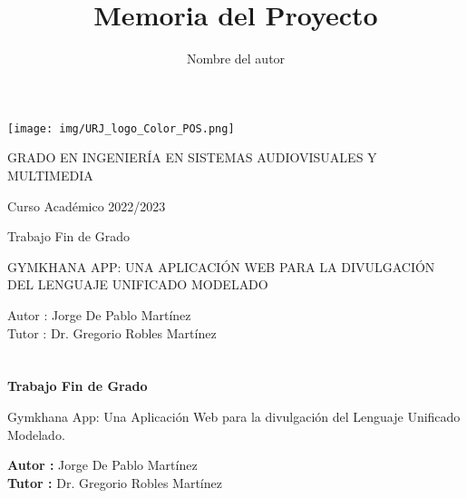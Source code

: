 \documentclass[a4paper, 12pt]{book}
\title{Memoria del Proyecto}
\author{Nombre del autor}
\begin{document}
\renewcommand{\refname}{Bibliografía}  %
\renewcommand{\appendixname}{Apéndice}


\begin{titlepage}
\begin{center}
\texttt{[image: img/URJ\_logo\_Color\_POS.png]}

\vspace{1.75cm}

\Large
GRADO EN INGENIERÍA EN SISTEMAS AUDIOVISUALES Y MULTIMEDIA

\vspace{0.4cm}

\large
Curso Académico 2022/2023

\vspace{0.8cm}

Trabajo Fin de Grado

\vspace{2.5cm}

\LARGE
GYMKHANA APP: UNA APLICACIÓN WEB PARA LA DIVULGACIÓN DEL LENGUAJE UNIFICADO MODELADO

\vspace{4cm}

\large
Autor : Jorge De Pablo Martínez \\
Tutor : Dr. Gregorio Robles Martínez
\end{center}
\end{titlepage}

\newpage
\mbox{}
\thispagestyle{empty} 


\clearpage
{}
\chapter*{}

\vspace{-4cm}
\begin{center}
\LARGE
\textbf{Trabajo Fin de Grado}

\vspace{1cm}
\large
Gymkhana App: Una Aplicación Web para la divulgación del Lenguaje Unificado Modelado. 

\vspace{1cm}
\large
\textbf{Autor :} Jorge De Pablo Martínez \\
\textbf{Tutor :} Dr. Gregorio Robles Martínez

\end{center}
\end{document}

